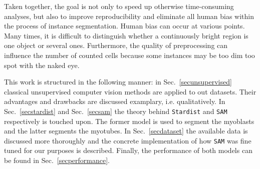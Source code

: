Taken together, the goal is not only to speed up otherwise time-consuming analyses, but also to improve reproducibility and eliminate all human bias within the process of instance segmentation. Human bias can occur at various points. Many times, it is difficult to distinguish whether a continuously bright region is one object or several ones. Furthermore, the quality of preprocessing can influence the number of counted cells because some instances may be too dim too spot with the naked eye.

This work is structured in the following manner: in Sec.~\ref{secunsupervised} classical unsupervised computer vision methods are applied to out datasets. Their advantages and drawbacks are discussed examplary, i.e. qualitatively. In Sec.~\ref{secstardist} and Sec.~\ref{secsam} the theory behind \texttt{Stardist} and \texttt{SAM} respectively is touched upon. The former model is used to segment the myoblasts and the latter segments the myotubes. In Sec.~\ref{secdataset} the available data is discussed more thoroughly and the concrete implementation of how \texttt{SAM} was fine tuned for our purposes is described. Finally, the performance of both models can be found in Sec.~\ref{secperformance}.
